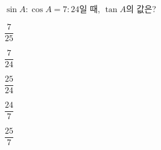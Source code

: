 $\sin A:\cos A=7:24$일 때, $\tan A$의 값은?
\begin{choices32}{\rule[-3ex]{0pt}{8ex}$\dfrac{7}{25}$}{\rule[-3ex]{0pt}{8ex}$\dfrac{7}{24}$}{\rule[-3ex]{0pt}{8ex}$\dfrac{25}{24}$}{\rule[-3ex]{0pt}{8ex}$\dfrac{24}{7}$}{\rule[-3ex]{0pt}{8ex}$\dfrac{25}{7}$}\end{choices32}
